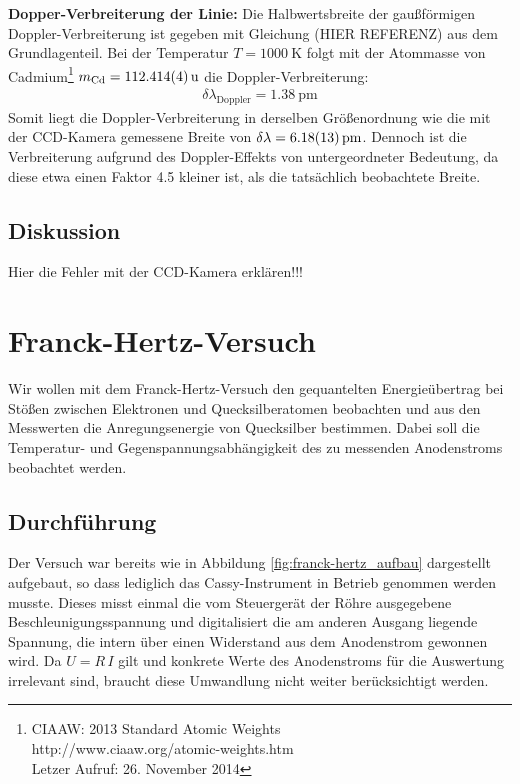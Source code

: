 \documentclass[11pt, a4paper]{article}
\begin{document}
\noindent
\textbf{Dopper-Verbreiterung der Linie:}
Die Halbwertsbreite der gaußförmigen Doppler-Verbreiterung ist gegeben mit Gleichung (HIER REFERENZ) aus dem Grundlagenteil.
Bei der Temperatur $T = \SI{1000}{\K}$ folgt mit der Atommasse von Cadmium\footnote{CIAAW: 2013 Standard Atomic Weights\\http://www.ciaaw.org/atomic-weights.htm\\Letzer Aufruf: 26. November 2014} $m_\mathrm{Cd} = \SI{112.414 +- 0.004}{\atomicmassunit} $ die Doppler-Verbreiterung:
\begin{align}
	\delta \lambda_\mathrm{Doppler} = \SI{1.38}{\pico\metre}
\end{align}
Somit liegt die Doppler-Verbreiterung in derselben Größenordnung wie die mit der CCD-Kamera gemessene Breite von $\delta \lambda = \SI{6.18 +- 0.13}{\pico\metre}$.
Dennoch ist die Verbreiterung aufgrund des Doppler-Effekts von untergeordneter Bedeutung, da diese etwa einen Faktor \num{4.5} kleiner ist, als die tatsächlich beobachtete Breite.

\subsection{Diskussion}
\label{ssec:diskussion_zeeman}
Hier die Fehler mit der CCD-Kamera erklären!!!

\FloatBarrier

\section{Franck-Hertz-Versuch}

Wir wollen mit dem Franck-Hertz-Versuch den gequantelten Energieübertrag bei Stößen zwischen Elektronen und Quecksilberatomen beobachten und aus den Messwerten die Anregungsenergie von Quecksilber bestimmen.
Dabei soll die Temperatur- und Gegenspannungsabhängigkeit des zu messenden Anodenstroms beobachtet werden.

\subsection{Durchführung}

Der Versuch war bereits  wie in Abbildung \ref{fig:franck-hertz_aufbau} dargestellt aufgebaut, so dass lediglich das Cassy-Instrument in Betrieb genommen werden musste.
Dieses misst einmal die vom Steuergerät der Röhre ausgegebene Beschleunigungsspannung und digitalisiert die am anderen Ausgang liegende Spannung, die intern über einen Widerstand aus dem Anodenstrom gewonnen wird.
Da $U=R\,I$ gilt und konkrete Werte des Anodenstroms für die Auswertung irrelevant sind, braucht diese Umwandlung nicht weiter berücksichtigt werden.
\end{document}
